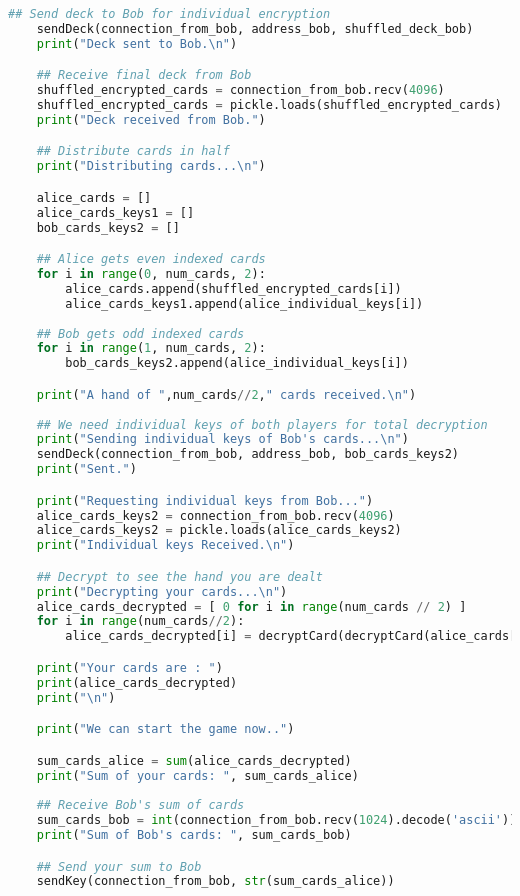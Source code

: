 \documentclass{article}
\begin{document}
\begin{lstlisting}[language=Python, caption=CVM.py]
    ## Send deck to Bob for individual encryption
    sendDeck(connection_from_bob, address_bob, shuffled_deck_bob)
    print("Deck sent to Bob.\n")

    ## Receive final deck from Bob
    shuffled_encrypted_cards = connection_from_bob.recv(4096)
    shuffled_encrypted_cards = pickle.loads(shuffled_encrypted_cards)
    print("Deck received from Bob.")

    ## Distribute cards in half
    print("Distributing cards...\n")

    alice_cards = []
    alice_cards_keys1 = []
    bob_cards_keys2 = []

    ## Alice gets even indexed cards
    for i in range(0, num_cards, 2):
        alice_cards.append(shuffled_encrypted_cards[i])
        alice_cards_keys1.append(alice_individual_keys[i])
    
    ## Bob gets odd indexed cards
    for i in range(1, num_cards, 2):
        bob_cards_keys2.append(alice_individual_keys[i])

    print("A hand of ",num_cards//2," cards received.\n")
    
    ## We need individual keys of both players for total decryption
    print("Sending individual keys of Bob's cards...\n")
    sendDeck(connection_from_bob, address_bob, bob_cards_keys2)
    print("Sent.")

    print("Requesting individual keys from Bob...")
    alice_cards_keys2 = connection_from_bob.recv(4096)
    alice_cards_keys2 = pickle.loads(alice_cards_keys2)
    print("Individual keys Received.\n")

    ## Decrypt to see the hand you are dealt
    print("Decrypting your cards...\n")
    alice_cards_decrypted = [ 0 for i in range(num_cards // 2) ]
    for i in range(num_cards//2):
        alice_cards_decrypted[i] = decryptCard(decryptCard(alice_cards[i], alice_cards_keys1[i]), alice_cards_keys2[i])

    print("Your cards are : ")
    print(alice_cards_decrypted)
    print("\n")

    print("We can start the game now..")

    sum_cards_alice = sum(alice_cards_decrypted)
    print("Sum of your cards: ", sum_cards_alice)
    
    ## Receive Bob's sum of cards
    sum_cards_bob = int(connection_from_bob.recv(1024).decode('ascii'))
    print("Sum of Bob's cards: ", sum_cards_bob)

    ## Send your sum to Bob
    sendKey(connection_from_bob, str(sum_cards_alice))


\end{lstlisting}
\end{document}
